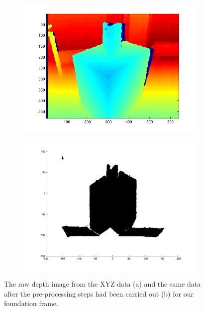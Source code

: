 \begin{figure}[H]
	\centering
	\begin{subfigure}[b]{0.45\textwidth}
		\centering
		\includegraphics[width=\textwidth]{Images/1-rawZImage.png}
		\caption{}
	\end{subfigure}%
	\hspace{1cm}
	\begin{subfigure}[b]{0.45\textwidth}
		\centering
		\includegraphics[width=\textwidth]{Images/3-RangeReduced.png}
		\caption{}
	\end{subfigure}
	\caption{The raw depth image from the XYZ data (a) and the same data after the pre-processing steps had been carried out (b) for our foundation frame.}
	\label{fig:preprocessing}
\end{figure}